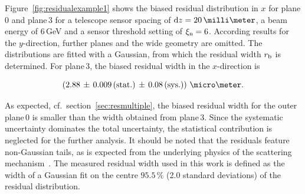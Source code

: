 \noindent

Figure~\ref{fig:residualexample1} shows the biased residual distribution in $x$ for plane\,0 and plane\,3 for a telescope sensor spacing of $\dz = 20\,\milli\meter$,
 a beam energy of 6\,GeV and a sensor threshold setting of $\xi_{\textrm{n}} = 6$. 
According results for the $y$-direction, further planes and the wide geometry are omitted. 
The distributions are fitted with a Gaussian, from which the residual width $r_{\textrm{b}}$ is determined. 
For plane\,3, the biased residual width in the $x$-direction is 

\begin{equation}
\left( 2.88\,\pm\, 0.009\,\textrm{(stat.)}\,\pm\, 0.08\, \textrm{(sys.)}\right)\,\micro\meter.
\end{equation}

\noindent
As expected, cf.\ section~\ref{sec:resmultiple}, the biased residual width for the outer plane\,0 is smaller than the width obtained from plane\,3.
Since the systematic uncertainty dominates the total uncertainty, the statistical contribution is neglected for the further analysis. 
It should be noted that the residuals feature non-Gaussian tails, as is expected from the underlying physics of the scattering mechanism~\cite{ref:PDG-2014}. 
The measured residual width used in this work is defined as the width of a Gaussian fit on the centre $95.5\,\%$ (2.0 standard deviations) of the residual distribution.

% 

